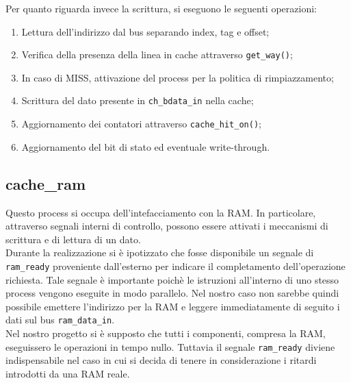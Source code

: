 Per quanto riguarda invece la scrittura, si eseguono le seguenti operazioni:
\begin{enumerate}
  \item Lettura dell'indirizzo dal bus separando index, tag e offset; 
  \item Verifica della presenza della linea in cache attraverso \texttt{get\_way()};
  \item In caso di MISS, attivazione del process per la politica di rimpiazzamento;
  \item Scrittura del dato presente in \texttt{ch\_bdata\_in} nella cache;
  \item Aggiornamento dei contatori attraverso \texttt{cache\_hit\_on()};
  \item Aggiornamento del bit di stato ed eventuale write-through.
\end{enumerate}





\subsection{cache\_ram}

Questo process si occupa dell'intefacciamento con la RAM. In particolare, attraverso segnali interni di controllo, possono essere attivati i meccanismi di scrittura e di lettura di un dato.\\

Durante la realizzazione si \`e ipotizzato che fosse disponibile un segnale di \texttt{ram\_ready} proveniente dall'esterno per indicare il completamento dell'operazione richiesta. Tale segnale \`e importante poich\`e le istruzioni all'interno di uno stesso process vengono eseguite in modo parallelo. Nel nostro caso non sarebbe quindi possibile emettere l'indirizzo per la RAM e leggere immediatamente di seguito i dati sul bus \texttt{ram\_data\_in}.\\

Nel nostro progetto si \`e supposto che tutti i componenti, compresa la RAM, eseguissero le operazioni in tempo nullo. Tuttavia il segnale \texttt{ram\_ready} diviene indispensabile nel caso in cui si decida di tenere in considerazione i ritardi introdotti da una RAM reale.


